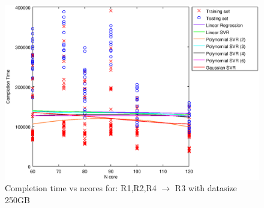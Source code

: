 
\begin {figure}[hbtp]
\centering
\includegraphics[width=\textwidth]{output/R1,R2,R4_R3_250_ALL_FEATURES/plot_R1,R2,R4_R3_250.eps}
\caption{Completion time vs ncores for: R1,R2,R4 $\rightarrow$ R3 with datasize 250GB}
\label{fig:coreonly_linear_R1,R2,R4_R3_250}
\end {figure}
